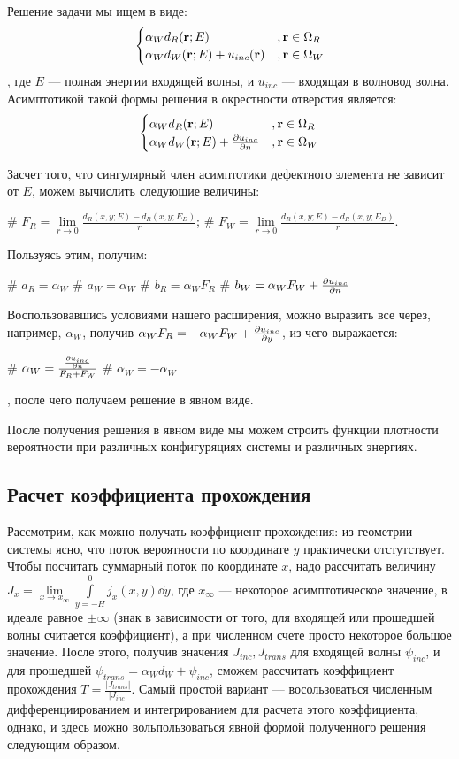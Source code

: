 Решение задачи мы ищем в виде:
\[
\begin{cases}
\alpha_W d_R(\vb{r}; E) &, \vb{r} \in \Omega_R \\
\alpha_W d_W(\vb{r}; E) + u_{inc}(\vb{r})&, \vb{r} \in \Omega_W
\end{cases}
\], где $E$ — полная энергии входящей волны, и $u_{inc}$ — входящая в волновод волна. Асимптотикой такой формы решения в окрестности отверстия является:
\[
\begin{cases}
\alpha_W d_R(\vb{r}; E) &, \vb{r} \in \Omega_R \\
\alpha_W d_W(\vb{r}; E) + \pdv{u_{inc}}{n} (\vb{r}) &, \vb{r} \in \Omega_W
\end{cases}
\]

Засчет того, что сингулярный член асимптотики дефектного элемента не зависит от $E$, можем вычислить следующие величины:
\begin{ilist}
# $F_R = \lim\limits_{r \to 0} \frac{d_R(x, y; E) - d_R(x, y; E_D)}{r}$;
# $F_W = \lim\limits_{r \to 0} \frac{d_R(x, y; E) - d_R(x, y; E_D)}{r}$.
\end{ilist}

Пользуясь этим, получим:
\begin{ilist}
# $a_R = \alpha_W$
# $a_W = \alpha_W$
# $b_R = \alpha_W F_R$
# $b_W = \alpha_W F_W + \pdv{u_{inc}}{n} (\vb{0})$
\end{ilist}

Воспользовавшись условиями нашего расширения, можно выразить все через, например, $\alpha_W$, получив $\alpha_W F_R = - \alpha_W F_W  + \pdv{u_{inc}}{y} (\vb{0})$, из чего выражается:
\begin{ilist}
# $\alpha_W = \frac{\pdv{u_{inc}}{n} (\vb{0})}{F_R + F_W}$
# $\alpha_W = - \alpha_W$
\end{ilist}
, после чего получаем решение в явном виде.

После получения решения в явном виде мы можем строить функции плотности вероятности при различных конфигуряциях системы и различных энергиях.

\subsection{Расчет коэффициента прохождения}
Рассмотрим, как можно получать коэффициент прохождения: из геометрии системы ясно, что поток вероятности по координате $y$ практически отстутствует. Чтобы посчитать суммарный поток по координате $x$, надо рассчитать величину $J_x = \lim\limits_{x \to x_\infty} \int\limits_{y = -H}^0 j_x(x, y) \dd{y}$, где $x_\infty$ — некоторое асимптотическое значение, в идеале равное $\pm \infty$ (знак в зависимости от того, для входящей или прошедшей волны считается коэффициент), а при численном счете просто некоторое большое значение. После этого, получив значения $J_{inc}, J_{trans}$ для входящей волны $\psi_{inc}$, и для прошедшей $\psi_{trans} = \alpha_W d_W + \psi_{inc}$, сможем рассчитать коэффициент прохождения $T = \frac{|J_{trans}|}{|J_{inc}|}$. Самый простой вариант — восользоваться численным дифференциированием и интегрированием для расчета этого коэффициента, однако, и здесь можно вольпользоваться явной формой полученного решения следующим образом.

